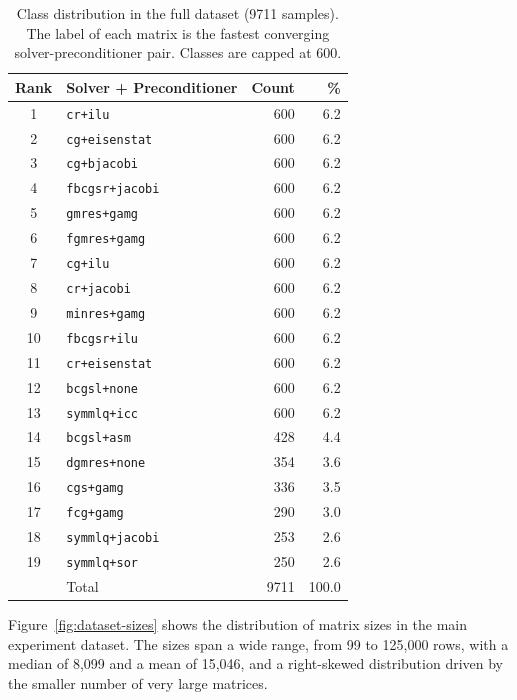 \begin{table}[H]
  \centering
  \caption{Class distribution in the full dataset (9711 samples).
           The label of each matrix is the fastest converging solver-preconditioner pair.
           Classes are capped at 600.}
  \label{tab:class-distribution}
  \begin{tabular}{clrr}
    \toprule
    Rank & Solver + Preconditioner & Count & \% \\
    \midrule
     1 & \texttt{cr+ilu}           & 600 & 6.2 \\
     2 & \texttt{cg+eisenstat}     & 600 & 6.2 \\
     3 & \texttt{cg+bjacobi}       & 600 & 6.2 \\
     4 & \texttt{fbcgsr+jacobi}    & 600 & 6.2 \\
     5 & \texttt{gmres+gamg}       & 600 & 6.2 \\
     6 & \texttt{fgmres+gamg}      & 600 & 6.2 \\
     7 & \texttt{cg+ilu}           & 600 & 6.2 \\
     8 & \texttt{cr+jacobi}        & 600 & 6.2 \\
     9 & \texttt{minres+gamg}      & 600 & 6.2 \\
    10 & \texttt{fbcgsr+ilu}       & 600 & 6.2 \\
    11 & \texttt{cr+eisenstat}     & 600 & 6.2 \\
    12 & \texttt{bcgsl+none}       & 600 & 6.2 \\
    13 & \texttt{symmlq+icc}       & 600 & 6.2 \\
    14 & \texttt{bcgsl+asm}        & 428 & 4.4 \\
    15 & \texttt{dgmres+none}      & 354 & 3.6 \\
    16 & \texttt{cgs+gamg}         & 336 & 3.5 \\
    17 & \texttt{fcg+gamg}         & 290 & 3.0 \\
    18 & \texttt{symmlq+jacobi}    & 253 & 2.6 \\
    19 & \texttt{symmlq+sor}       & 250 & 2.6 \\
    \midrule
    & Total                        & 9711 & 100.0 \\
    \bottomrule
  \end{tabular}
\end{table}

Figure~\ref{fig:dataset-sizes} shows the distribution of matrix sizes in the main experiment dataset.
The sizes span a wide range, from 99 to 125{,}000 rows, with a median of 8{,}099 and a mean of 15{,}046,
and a right-skewed distribution driven by the smaller number of very large matrices.


